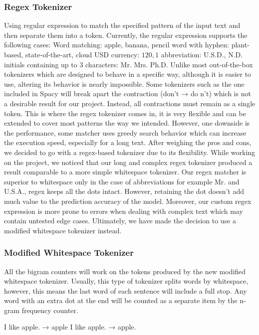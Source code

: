 \documentclass[12pt,oneside,openright,a4paper]{cpe-english-project}
\begin{document}
\subsubsection{Regex Tokenizer}
Using regular expression to match the specified pattern of the input text and then separate them into a token. Currently, the regular expression supports the following cases:
Word matching: apple, banana, pencil
word with hyphen: plant-based, state-of-the-art, cloud USD currency: $120, 1$
abbreviation: U.S.D., N.D.
initials containing up to 3 characters: Mr. Mrs. Ph.D.
Unlike most out-of-the-box tokenizers which are designed to behave in a specific way, although it is easier to use, altering its behavior is nearly impossible. Some tokenizers such as the one included in Spacy will break apart the contraction (don’t → do n’t) which is not a desirable result for our project. Instead, all contractions must remain as a single token. This is where the regex tokenizer comes in, it is very flexible and can be extended to cover most patterns the way we intended. However, one downside is the performance, some matcher uses greedy search behavior which can increase the execution speed, especially for a long text. After weighing the pros and cons, we decided to go with a regex-based tokenizer due to its flexibility.
While working on the project, we noticed that our long and complex regex tokenizer produced a result comparable to a more simple whitespace tokenizer. Our regex matcher is superior to whitespace only in the case of abbreviations for example Mr. and U.S.A., regex keeps all the dots intact. However, retaining the dot doesn’t add much value to the prediction accuracy of the model. Moreover, our custom regex expression is more prone to errors when dealing with complex text which may contain untested edge cases.  Ultimately, we have made the decision to use a modified whitespace tokenizer instead.

\subsubsection{Modified Whitespace Tokenizer}
All the bigram counters will work on the tokens produced by the new modified whitespace tokenizer. Usually, this type of tokenizer splits words by whitespace, however, this means the last word of each sentence will include a full stop. Any word with an extra dot at the end will be counted as a separate item by the n-gram frequency counter. 

I like apple. → apple 
I like apple. → apple.
\end{document}
